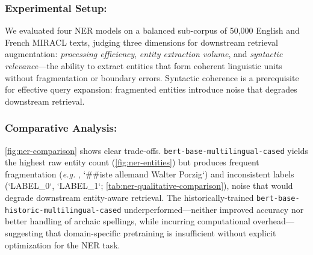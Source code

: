 \documentclass[11pt]{article}
\newcommand{\eg}{\textit{e.g. }}
\begin{document}
\subsubsection{Experimental Setup:} We evaluated four NER models on a balanced sub-corpus of 50,000 English and French MIRACL texts, judging three dimensions for downstream retrieval augmentation: \textit{processing efficiency}, \textit{entity extraction volume}, and \textit{syntactic relevance}---the ability to extract entities that form coherent linguistic units without fragmentation or boundary errors. Syntactic coherence is a prerequisite for effective query expansion: fragmented entities introduce noise that degrades downstream retrieval.

\subsubsection{Comparative Analysis:} \cref{fig:ner-comparison} shows clear trade-offs. \texttt{bert-base-multilingual-cased} yields the highest raw entity count (\cref{fig:ner-entities}) but produces frequent fragmentation (\eg, `\#\#iste allemand Walter Porzig`) and inconsistent labels (`LABEL\_0`, `LABEL\_1`; \cref{tab:ner-qualitative-comparison}), noise that would degrade downstream entity-aware retrieval. The historically-trained \texttt{bert-base-historic-multilingual-cased} underperformed---neither improved accuracy nor better handling of archaic spellings, while incurring computational overhead---suggesting that domain-specific pretraining is insufficient without explicit optimization for the NER task.

\begin{table}[t]
    \centering
    \caption{Qualitative comparison of entity extraction.}
    \label{tab:ner-qualitative-comparison}
\end{table}
\end{document}
